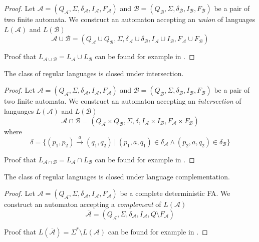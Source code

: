 \begin{proof}
	Let $\mathcal{A} = (Q_\mathcal{A}, \Sigma, \delta_\mathcal{A}, I_\mathcal{A}, F_\mathcal{A})$ and $\mathcal{B} = (Q_\mathcal{B}, \Sigma, \delta_\mathcal{B}, I_\mathcal{B}, F_\mathcal{B})$ be a pair of two finite automata. We construct an automaton accepting an \emph{union} of languages $L(\mathcal{A})$ and $L(\mathcal{B})$  $$ \mathcal{A} \cup \mathcal{B} = (Q_\mathcal{A} \cup Q_\mathcal{B}, \Sigma, \delta_\mathcal{A} \cup \delta_\mathcal{B}, I_\mathcal{A} \cup I_\mathcal{B}, F_\mathcal{A} \cup F_\mathcal{B})$$
	
	Proof that $L_{\mathcal{A} \cup \mathcal{B}} = L_\mathcal{A} \cup L_\mathcal{B}$ can be found for example in \cite{tin}.
\end{proof}

  \begin{theorem}
	 The class of regular languages is closed under intersection.
	\end{theorem}
	
	\begin{proof}
	Let $\mathcal{A} = (Q_\mathcal{A}, \Sigma, \delta_\mathcal{A}, I_\mathcal{A}, F_\mathcal{A})$ and $\mathcal{B} = (Q_\mathcal{B}, \Sigma, \delta_\mathcal{B}, I_\mathcal{B}, F_\mathcal{B})$ be a pair of two finite automata. We construct an automaton accepting an \emph{intersection} of languages $L(\mathcal{A})$ and $L(\mathcal{B})$ 
	$$\mathcal{A} \cap \mathcal{B} = (Q_\mathcal{A} \times Q_\mathcal{B}, \Sigma, \delta, I_\mathcal{A} \times I_\mathcal{B}, F_\mathcal{A} \times F_\mathcal{B})$$ where $$\delta = \{(p_1, p_2) \overset{a}{\longrightarrow} (q_1, q_2)\ |\ (p_1, a, q_1) \in \delta_\mathcal{A} \wedge (p_2, a, q_2) \in \delta_\mathcal{B}\}$$
	
	Proof that $L_{\mathcal{A} \cap \mathcal{B}} = L_\mathcal{A} \cap L_\mathcal{B}$ can be found for example in \cite{tin}.
\end{proof}
	
 \begin{theorem}
  The class of regular languages is closed under language complementation.
\end{theorem}
	
	\begin{proof}
	Let $\mathcal{A} = (Q_\mathcal{A}, \Sigma, \delta_\mathcal{A}, I_\mathcal{A}, F_\mathcal{A})$ be a complete deterministic FA. We construct an automaton accepting a \emph{complement} of $L(\mathcal{A})$
	$$\overline{\mathcal{A}} = (Q_\mathcal{A}, \Sigma, \delta_\mathcal{A}, I_\mathcal{A}, Q \setminus F_\mathcal{A})$$
	
	Proof that $L(\overline{\mathcal{A}}) = \Sigma^* \setminus L(\mathcal{A})$ can be found for example in \cite{tin}.
 \end{proof}

